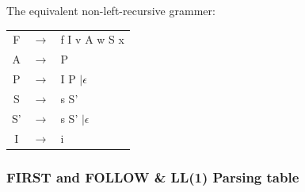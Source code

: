 \documentclass{article}
\begin{document}
The equivalent non-left-recursive grammer:\\
\begin{tabular}{ccl}
F & $\rightarrow$ & f I v A w S x \\ 
A & $\rightarrow$ & P \\
P & $\rightarrow$ & I P $| \epsilon$\\ 
S & $\rightarrow$ & s S'\\
S' & $\rightarrow$ & s S' $| \epsilon$\\
I & $\rightarrow$ & i\\
\end{tabular}

\subsubsection{{\ttfamily FIRST} and {\ttfamily FOLLOW} \& LL(1) Parsing table}
\end{document}
